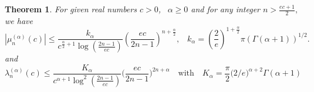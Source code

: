 \documentclass[]{article}
\newtheorem{theorem}{Theorem}
\newcounter{rea}
\begin{document}
\begin{theorem}\label{decaylambda}
	For given real numbers $c > 0$,$ \;\; \;\alpha\geq 0$ and for any integer $n > \frac{ec+1}{2},$ we have
	\begin{equation}\label{Eq3.1}
	| \mu_n^{(\alpha)}(c)| \leq  \frac{k_{\alpha}}{c^{\frac{\alpha}{2}+1}\log\left(\frac{2n-1}{ec}\right)}
	\left(\frac{ec}{2n-1}\right)^{n+\frac{\alpha}{2}},\;\;\; k_{\alpha}=\left(\frac{2}{e}\right)^{1+\frac{\alpha}{2}}\pi(\Gamma(\alpha+1))^{1/2}.
	\end{equation}
	and
	\begin{equation}\label{newdecay}
	\lambda_n^{(\alpha)}(c) \leq \frac{K_\alpha}{c^{\alpha+1}\log^2(\frac{2n-1}{ec})}\Big(\frac{ec}{2n-1}\Big)^{2n+\alpha} \quad \mbox{with} \quad K_{\alpha} = \frac{\pi}{2}\big(2/e \big)^{\alpha+2} \Gamma(\alpha+1)
	\end{equation}
\end{theorem}
\end{document}
